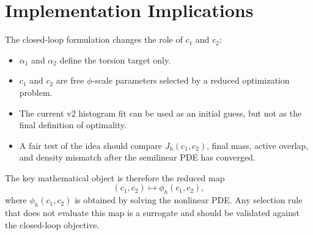 \documentclass[11pt]{article}
\begin{document}
\section{Implementation Implications}

The closed-loop formulation changes the role of \(c_1\) and \(c_2\):
\begin{itemize}
  \item \(\alpha_1\) and \(\alpha_2\) define the torsion target only.
  \item \(c_1\) and \(c_2\) are free \(\phi\)-scale parameters selected by a
  reduced optimization problem.
  \item The current v2 histogram fit can be used as an initial guess, but not
  as the final definition of optimality.
  \item A fair test of the idea should compare \(J_h(c_1,c_2)\), final mass,
  active overlap, and density mismatch after the semilinear PDE has converged.
\end{itemize}

The key mathematical object is therefore the reduced map
\[
  (c_1,c_2)
  \longmapsto
  \phi_h(c_1,c_2),
\]
where \(\phi_h(c_1,c_2)\) is obtained by solving the nonlinear PDE.  Any
selection rule that does not evaluate this map is a surrogate and should be
validated against the closed-loop objective.
\end{document}
